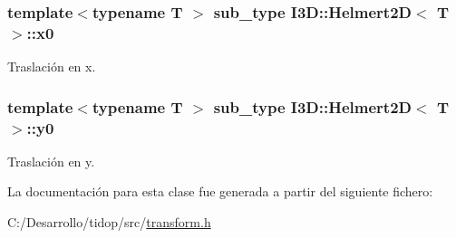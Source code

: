 \subsubsection[{\texorpdfstring{x0}{x0}}]{\setlength{\rightskip}{0pt plus 5cm}template$<$typename T $>$ {\bf sub\+\_\+type} {\bf I3\+D\+::\+Helmert2D}$<$ T $>$\+::x0}\hypertarget{class_i3_d_1_1_helmert2_d_ad0bb6ad335ff383cf85f29a3da60c2e7}{}\label{class_i3_d_1_1_helmert2_d_ad0bb6ad335ff383cf85f29a3da60c2e7}


Traslación en x. 

\subsubsection[{\texorpdfstring{y0}{y0}}]{\setlength{\rightskip}{0pt plus 5cm}template$<$typename T $>$ {\bf sub\+\_\+type} {\bf I3\+D\+::\+Helmert2D}$<$ T $>$\+::y0}\hypertarget{class_i3_d_1_1_helmert2_d_a60ddf8a70434410bc53e610abf583dbe}{}\label{class_i3_d_1_1_helmert2_d_a60ddf8a70434410bc53e610abf583dbe}


Traslación en y. 



La documentación para esta clase fue generada a partir del siguiente fichero\+:\begin{DoxyCompactItemize}
\item 
C\+:/\+Desarrollo/tidop/src/\hyperlink{transform_8h}{transform.\+h}\end{DoxyCompactItemize}
